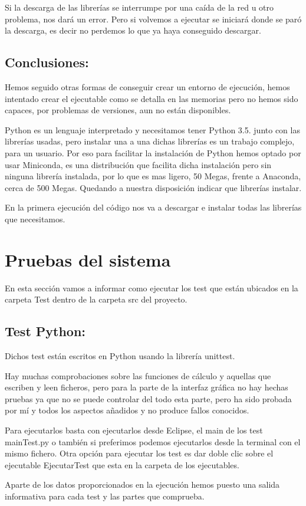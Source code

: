 Si la descarga de las librerías se interrumpe por una caída de la red u otro problema, nos dará un error. Pero si volvemos a ejecutar se iniciará donde se paró la descarga, es decir no perdemos lo que ya haya conseguido descargar.


\subsection{Conclusiones:}
Hemos seguido otras formas de conseguir crear un entorno de ejecución, hemos intentado crear el ejecutable como se detalla en las memorias pero no hemos sido capaces, por problemas de versiones, aun no están disponibles.

Python es un lenguaje interpretado y necesitamos tener Python 3.5. junto con las librerías usadas, pero instalar una a una dichas librerías es un trabajo complejo, para un usuario. Por eso para facilitar la instalación de Python hemos optado por usar Miniconda, es una distribución que facilita dicha instalación pero sin ninguna librería instalada, por lo que es mas ligero, 50 Megas, frente a Anaconda, cerca de 500 Megas. Quedando a nuestra disposición indicar que librerías instalar.

En la primera ejecución del código nos va a descargar e instalar todas las librerías que necesitamos.

\section{Pruebas del sistema}
En esta sección vamos a informar como ejecutar los test que están ubicados en la carpeta Test dentro de la carpeta src del proyecto. 

\subsection{Test Python:}
Dichos test están escritos en Python usando la librería unittest.

Hay muchas comprobaciones sobre las funciones de cálculo y aquellas que escriben y leen ficheros, pero para la parte de la interfaz gráfica no hay hechas pruebas ya que no se puede controlar del todo esta parte, pero ha sido probada por mí y todos los aspectos añadidos y no produce fallos conocidos.

Para ejecutarlos basta con ejecutarlos desde Eclipse, el main de los test mainTest.py o también si preferimos podemos ejecutarlos desde la terminal con el mismo fichero.
Otra opción para ejecutar los test es dar doble clic sobre el ejecutable EjecutarTest que esta en la carpeta de los ejecutables. 

Aparte de los datos proporcionados en la ejecución hemos puesto una salida informativa para cada test y las partes que comprueba.
 